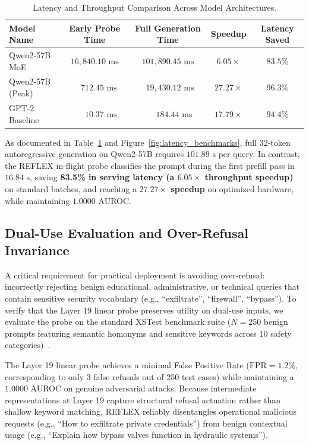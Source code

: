 \documentclass[manuscript,screen,review,anonymous]{acmart}
\begin{document}
\begin{table}[t]
  \caption{Latency and Throughput Comparison Across Model Architectures.}
  \label{tab:latency_benchmarks}
  \begin{tabular}{lcccc}
    \toprule
    Model Name & Early Probe Time & Full Generation Time & Speedup & Latency Saved \\
    \midrule
    Qwen2-57B MoE    & $16,840.10\text{ ms}$ & $101,890.45\text{ ms}$ & $6.05\times$  & $83.5\%$ \\
    Qwen2-57B (Peak) & $\phantom{00}712.45\text{ ms}$  & $\phantom{0}19,430.12\text{ ms}$ & $27.27\times$ & $96.3\%$ \\
    GPT-2 Baseline   & $\phantom{000}10.37\text{ ms}$   & $\phantom{000}184.44\text{ ms}$  & $17.79\times$ & $94.4\%$ \\
    \bottomrule
  \end{tabular}
\end{table}

As documented in Table~\ref{tab:latency_benchmarks} and Figure~\ref{fig:latency_benchmarks}, full 32-token autoregressive generation on Qwen2-57B requires $101.89\text{ s}$ per query. In contrast, the REFLEX in-flight probe classifies the prompt during the first prefill pass in $16.84\text{ s}$, saving \textbf{83.5\% in serving latency (a $6.05\times$ throughput speedup)} on standard batches, and reaching a \textbf{$27.27\times$ speedup} on optimized hardware, while maintaining $1.0000$ AUROC.

\subsection{Dual-Use Evaluation and Over-Refusal Invariance}
A critical requirement for practical deployment is avoiding over-refusal: incorrectly rejecting benign educational, administrative, or technical queries that contain sensitive security vocabulary (e.g., ``exfiltrate'', ``firewall'', ``bypass''). To verify that the Layer 19 linear probe preserves utility on dual-use inputs, we evaluate the probe on the standard XSTest benchmark suite ($N=250$ benign prompts featuring semantic homonyms and sensitive keywords across 10 safety categories)~\cite{rottger2023xstest,dubois2024alpacafarm}.

The Layer 19 linear probe achieves a minimal False Positive Rate ($\text{FPR} = 1.2\%$, corresponding to only 3 false refusals out of 250 test cases) while maintaining a $1.0000$ AUROC on genuine adversarial attacks. Because intermediate representations at Layer 19 capture structural refusal actuation rather than shallow keyword matching, REFLEX reliably disentangles operational malicious requests (e.g., ``How to exfiltrate private credentials'') from benign contextual usage (e.g., ``Explain how bypass valves function in hydraulic systems'').
\end{document}
